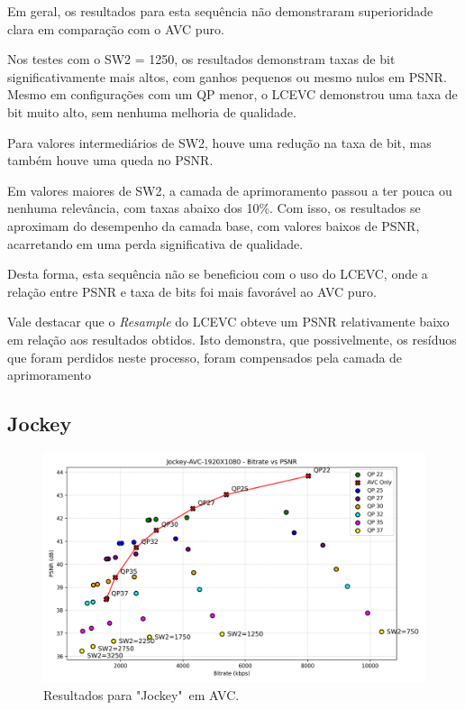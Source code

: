 Em geral, os resultados para esta sequência não demonstraram superioridade clara
em comparação com o \acrshort{AVC} puro.

Nos testes com o SW2 = 1250, os resultados demonstram taxas de bit
significativamente mais altos, com ganhos pequenos ou mesmo nulos em \acrshort{PSNR}.
Mesmo em configurações com um QP menor, o \acrshort{LCEVC} demonstrou uma taxa de bit
muito alto, sem nenhuma melhoria de qualidade.

Para valores intermediários de SW2, houve uma redução na taxa de bit, mas
também houve uma queda no \acrshort{PSNR}.

Em valores maiores de SW2, a camada de aprimoramento passou a ter pouca ou nenhuma
relevância, com taxas abaixo dos 10\%. Com isso, os resultados se aproximam do
desempenho da camada base, com valores baixos de \acrshort{PSNR}, acarretando
em uma perda significativa de qualidade.

Desta forma, esta sequência não se beneficiou com o uso do \acrshort{LCEVC}, onde
a relação entre \acrshort{PSNR} e taxa de bits foi mais favorável ao \acrshort{AVC}
puro.

Vale destacar que o \textit{Resample} do \acrshort{LCEVC} obteve um \acrshort{PSNR}
relativamente baixo em relação aos resultados obtidos. Isto demonstra, que possivelmente,
os resíduos que foram perdidos neste processo, foram compensados pela camada de 
aprimoramento

\newpage
\subsection{Jockey}

\begin{figure}[h!]
    \centering
    \includegraphics[width=1.0\textwidth]{img/Jockey-AVC.png}
    \caption{Resultados para "Jockey"\ em \acrshort{AVC}. \cite{uvg_dataset}}
    \label{fig:Jockey}
\end{figure}

